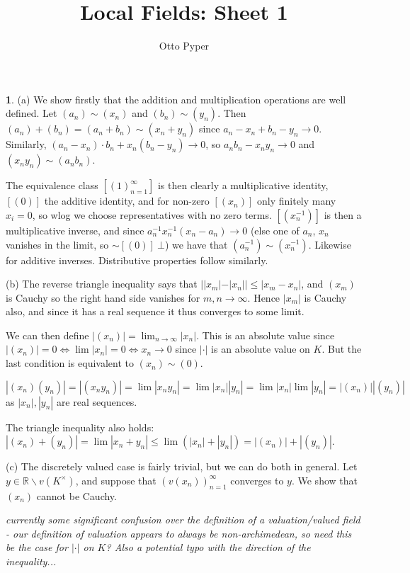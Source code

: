 \documentclass[]{article}
\title{Local Fields: Sheet 1}
\author{Otto Pyper}
\date{}
\theoremstyle{custhm}
\theoremstyle{cusdef}
\theoremstyle{custhm}
\theoremstyle{custhm}
\theoremstyle{custhm}
\theoremstyle{custhm}
\theoremstyle{cusdef}
\theoremstyle{remark}
\newcommand{\R}{\mathbb{R}}
\newcommand{\ra}{\rightarrow}
\renewcommand{\it}[1]{\textit{#1}}
\begin{document}
\maketitle
\clearpage

\textbf{1}. (a) We show firstly that the addition and multiplication operations are well defined. Let $(a_n)\sim (x_n)$ and $(b_n)\sim (y_n)$. Then $(a_n)+(b_n) = (a_n+b_n)\sim (x_n+y_n)$ since $a_n-x_n+b_n-y_n \ra 0$. Similarly, $(a_n-x_n)\cdot b_n + x_n(b_n-y_n)\ra 0$, so $a_nb_n-x_ny_n\ra 0$ and $(x_ny_n)\sim(a_nb_n)$.

The equivalence class $[(1)_{n=1}^{\infty}]$ is then clearly a multiplicative identity, $[(0)]$ the additive identity, and for non-zero $[(x_n)]$ only finitely many $x_i = 0$, so wlog we choose representatives with no zero terms. $[(x_n^{-1})]$ is then a multiplicative inverse, and since $a_n^{-1}x_n^{-1}(x_n - a_n)\ra 0$ (else one of $a_n$, $x_n$ vanishes in the limit, so $\sim [(0)]\ \bot$) we have that $(a_n^{-1})\sim(x_n^{-1})$. Likewise for additive inverses. Distributive properties follow similarly.

(b) The reverse triangle inequality says that $||x_m| - |x_n||\le |x_m - x_n|$, and $(x_m)$ is Cauchy so the right hand side vanishes for $m,n\ra\infty$. Hence $|x_m|$ is Cauchy also, and since it has a real sequence it thus converges to some limit.

We can then define $|(x_n)| = \lim_{n\ra\infty}|x_n|$. This is an absolute value since $|(x_n)| = 0 \iff \lim |x_n| = 0 \iff x_n\ra 0$ since $|\cdot|$ is an absolute value on $K$. But the last condition is equivalent to $(x_n)\sim (0)$.

$|(x_n)(y_n)| = |(x_ny_n)| = \lim|x_ny_n| = \lim|x_n||y_n| = \lim|x_n|\lim|y_n| = |(x_n)||(y_n)|$ as $|x_n|,|y_n|$ are real sequences.

The triangle inequality also holds: $|(x_n)+(y_n)| = \lim |x_n + y_n|\le \lim (|x_n| + |y_n|) = |(x_n)| + |(y_n)|$.

(c) The discretely valued case is fairly trivial, but we can do both in general. Let $y \in \R\backslash v(K^\times)$, and suppose that $(v(x_n))_{n=1}^{\infty}$ converges to $y$. We show that $(x_n)$ cannot be Cauchy.

\it{currently some significant confusion over the definition of a valuation/valued field - our definition of valuation appears to always be non-archimedean, so need this be the case for $|\cdot|$ on $K$? Also a potential typo with the direction of the inequality...}
\end{document}
